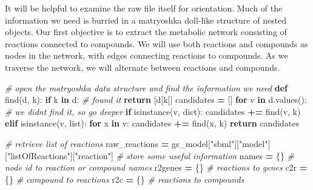 \documentclass[
]{book}
\newenvironment{Shaded}{\begin{snugshade}}{\end{snugshade}}
\newcommand{\BuiltInTok}[1]{#1}
\newcommand{\CommentTok}[1]{\textcolor[rgb]{0.56,0.35,0.01}{\textit{#1}}}
\newcommand{\ControlFlowTok}[1]{\textcolor[rgb]{0.13,0.29,0.53}{\textbf{#1}}}
\newcommand{\KeywordTok}[1]{\textcolor[rgb]{0.13,0.29,0.53}{\textbf{#1}}}
\newcommand{\NormalTok}[1]{#1}
\newcommand{\OperatorTok}[1]{\textcolor[rgb]{0.81,0.36,0.00}{\textbf{#1}}}
\newcommand{\StringTok}[1]{\textcolor[rgb]{0.31,0.60,0.02}{#1}}
\begin{document}
It will be helpful to examine the raw file itself for orientation. Much of the information we need is burried in a matryoshka doll-like
structure of nested objects. Our first objective is to extract the metabolic network consisting of reactions connected to compounds.
We will use both reactions and compounds as nodes in the network, with edges connecting reactions to compounds. As we traverse the network,
we will alternate between reactions and compounds.

\begin{Shaded}
\begin{Highlighting}[numbers=left,,]
\CommentTok{\# open the matryoshka data structure and find the information we need}
\KeywordTok{def}\NormalTok{ find(d, k):}
    \ControlFlowTok{if}\NormalTok{ k }\KeywordTok{in}\NormalTok{ d:  }\CommentTok{\# found it}
        \ControlFlowTok{return}\NormalTok{ [d[k]]}
\NormalTok{    candidates }\OperatorTok{=}\NormalTok{ []}
    \ControlFlowTok{for}\NormalTok{ v }\KeywordTok{in}\NormalTok{ d.values(): }\CommentTok{\# we didn\textquotesingle{}t find it, so go deeper}
        \ControlFlowTok{if} \BuiltInTok{isinstance}\NormalTok{(v, }\BuiltInTok{dict}\NormalTok{):}
\NormalTok{            candidates }\OperatorTok{+=}\NormalTok{ find(v, k)}
        \ControlFlowTok{elif} \BuiltInTok{isinstance}\NormalTok{(v, }\BuiltInTok{list}\NormalTok{):}
            \ControlFlowTok{for}\NormalTok{ x }\KeywordTok{in}\NormalTok{ v:}
\NormalTok{                candidates }\OperatorTok{+=}\NormalTok{ find(x, k)}
    \ControlFlowTok{return}\NormalTok{ candidates}

\CommentTok{\# retrieve list of reactions}
\NormalTok{raw\_reactions }\OperatorTok{=}\NormalTok{ gs\_model[}\StringTok{"sbml"}\NormalTok{][}\StringTok{"model"}\NormalTok{][}\StringTok{"listOfReactions"}\NormalTok{][}\StringTok{"reaction"}\NormalTok{]}
\CommentTok{\# store some useful information}
\NormalTok{names }\OperatorTok{=}\NormalTok{ \{\}      }\CommentTok{\# node id to reaction or compound names}
\NormalTok{r2genes }\OperatorTok{=}\NormalTok{ \{\}    }\CommentTok{\# reactions to genes}
\NormalTok{c2r }\OperatorTok{=}\NormalTok{ \{\}        }\CommentTok{\# compound to reactions}
\NormalTok{r2c }\OperatorTok{=}\NormalTok{ \{\}        }\CommentTok{\# reactions to compounds}


\end{Highlighting}
\end{Shaded}
\end{document}
